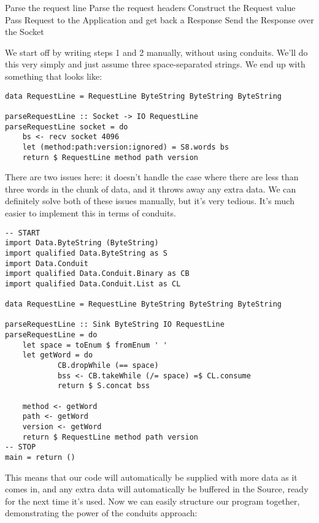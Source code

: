   
   Parse the request line
   Parse the request headers
   Construct the Request value
   Pass Request to the Application and get back a Response
   Send the Response over the Socket
  
We start off by writing steps 1 and 2 manually, without using conduits. We'll do this very
simply and just assume three space-separated strings. We end up with something that looks
like:
\begin{lstlisting}
data RequestLine = RequestLine ByteString ByteString ByteString

parseRequestLine :: Socket -> IO RequestLine
parseRequestLine socket = do
    bs <- recv socket 4096
    let (method:path:version:ignored) = S8.words bs
    return $ RequestLine method path version
\end{lstlisting}
There are two issues here: it doesn't handle the case where there are less than three
words in
the chunk of data, and it throws away any extra data. We can definitely solve both of
these
issues manually, but it's very tedious. It's much easier to implement this in terms of
conduits.
\begin{lstlisting}
-- START
import Data.ByteString (ByteString)
import qualified Data.ByteString as S
import Data.Conduit
import qualified Data.Conduit.Binary as CB
import qualified Data.Conduit.List as CL

data RequestLine = RequestLine ByteString ByteString ByteString

parseRequestLine :: Sink ByteString IO RequestLine
parseRequestLine = do
    let space = toEnum $ fromEnum ' '
    let getWord = do
            CB.dropWhile (== space)
            bss <- CB.takeWhile (/= space) =$ CL.consume
            return $ S.concat bss

    method <- getWord
    path <- getWord
    version <- getWord
    return $ RequestLine method path version
-- STOP
main = return ()
\end{lstlisting}
This means that our code will automatically be supplied with more data as it comes in, and
any
extra data will automatically be buffered in the Source, ready for the next time
it's used. Now we can easily structure our program together, demonstrating the power of
the
conduits approach:
